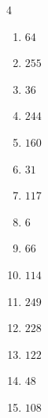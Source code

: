 \begin{multicols}{4}
\begin{enumerate}

  \item $64$


  \item $255$


  \item $36$


  \item $244$


  \item $160$


  \item $31$


  \item $117$


  \item $6$


  \item $66$


  \item $114$


  \item $249$


\columnbreak %

  \item $228$


  \item $122$


  \item $48$


  \item $108$



\end{enumerate}
\end{multicols}
